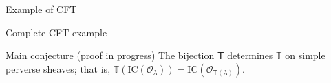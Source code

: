 \documentclass[final]{beamer}
\newlength{\threecolwid}
\newcommand{\TT}{\mathbb{T}}
\newcommand{\cO}{\mathcal{O}}
\newcommand{\sT}{\mathsf{T}}
\newcommand{\IC}{\mathrm{IC}}
\begin{document}
\begin{frame}[t]
\begin{columns}[t]
\begin{column}{\threecolwid}
\vspace{-8mm}
\begin{block}{Example of CFT}
\begin{center}

\end{center}
\end{block}


\begin{block}{Complete CFT example}
\begin{center}
\end{center}
\end{block}

\vspace{-7mm}
\begin{alertblock}{Main conjecture (proof in progress)}
The bijection $\sT$ determines $\TT$ on simple perverse sheaves; that is, $\TT(\IC(\cO_{\lambda})) = \IC(\cO_{\sT(\lambda)})$.    

\end{alertblock}

\end{column} %

\end{columns} %

\end{frame} %
\end{document}
